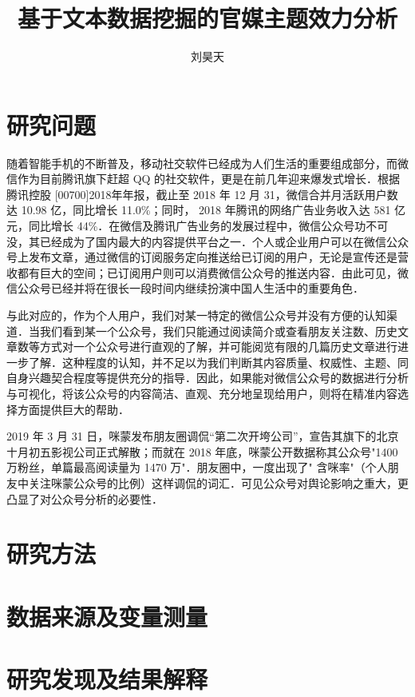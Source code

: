 \documentclass[a4paper,12pt]{article}
\title{基于文本数据挖掘的官媒主题效力分析}
\author{刘昊天}
\begin{document}
    \maketitle
    \section{研究问题}
    随着智能手机的不断普及，移动社交软件已经成为人们生活的重要组成部分，而微信作为目前腾讯旗下赶超 QQ 的社交软件，更是在前几年迎来爆发式增长．根据腾讯控股 [00700]2018年年报，截止至 2018 年 12 月 31，微信合并月活跃用户数达 10.98 亿，同比增长 11.0\%；同时， 2018 年腾讯的网络广告业务收入达 581 亿元，同比增长 44\%．在微信及腾讯广告业务的发展过程中，微信公众号功不可没，其已经成为了国内最大的内容提供平台之一．个人或企业用户可以在微信公众号上发布文章，通过微信的订阅服务定向推送给已订阅的用户，无论是宣传还是营收都有巨大的空间；已订阅用户则可以消费微信公众号的推送内容．由此可见，微信公众号已经并将在很长一段时间内继续扮演中国人生活中的重要角色．

    与此对应的，作为个人用户，我们对某一特定的微信公众号并没有方便的认知渠道．当我们看到某一个公众号，我们只能通过阅读简介或查看朋友关注数、历史文章数等方式对一个公众号进行直观的了解，并可能阅览有限的几篇历史文章进行进一步了解．这种程度的认知，并不足以为我们判断其内容质量、权威性、主题、同自身兴趣契合程度等提供充分的指导．因此，如果能对微信公众号的数据进行分析与可视化，将该公众号的内容简洁、直观、充分地呈现给用户，则将在精准内容选择方面提供巨大的帮助．

    2019 年 3 月 31 日，咪蒙发布朋友圈调侃“第二次开垮公司”，宣告其旗下的北京〸月初五影视公司正式解散；而就在 2018 年底，咪蒙公开数据称其公众号"1400 万粉丝，单篇最高阅读量为 1470 万"．朋友圈中，一度出现了" 含咪率"（个人朋友中关注咪蒙公众号的比例）这样调侃的词汇．可见公众号对舆论影响之重大，更凸显了对公众号分析的必要性．
    \section{研究方法}

    \section{数据来源及变量测量}

    \section{研究发现及结果解释}

    \label{applastpage}
\iffalse
\begin{itemize}[noitemsep,topsep=0pt]
\end{itemize}
\begin{enumerate}[label=\Roman{*}.,noitemsep,topsep=0pt]
\end{enumerate}
\begin{multicols}{2}
\end{multicols}
\begin{figure}
  \centering
  \texttt{[image: ]}
  \caption{}
  \label{fig:}
\end{figure}
\fi
\end{document}
